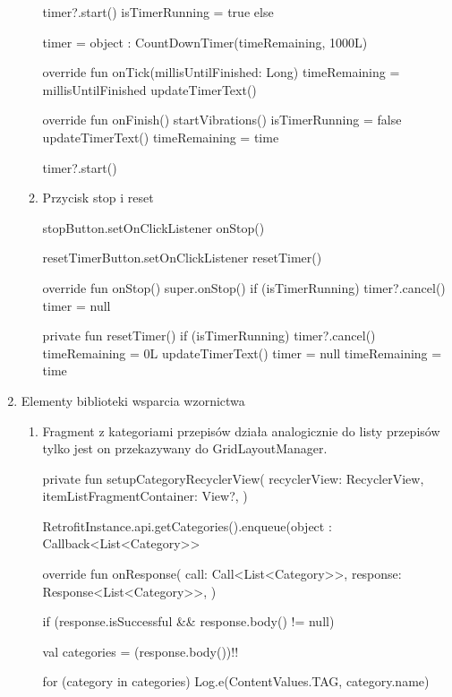 \documentclass{article}
\begin{document}
\begin{enumerate}
\begin{enumerate}
\begin{mylisting}
{{            timer?.start()
            isTimerRunning = true
        } else {
            timer = object : CountDownTimer(timeRemaining, 1000L) {
                override fun onTick(millisUntilFinished: Long) {
                    timeRemaining = millisUntilFinished
                    updateTimerText()
                }

                override fun onFinish() {
                    startVibrations()
                    isTimerRunning = false
                    updateTimerText()
                    timeRemaining = time
                }
            }
            timer?.start()
        }
    }
\end{mylisting}

\newpage
\item Przycisk stop i  reset

\begin{mylisting}
stopButton.setOnClickListener {
    onStop()
}

resetTimerButton.setOnClickListener {
    resetTimer()
}


override fun onStop() {
    super.onStop()
    if (isTimerRunning) {
        timer?.cancel()
        timer = null
    }
}

private fun resetTimer() {
    if (isTimerRunning) {
        timer?.cancel()
        timeRemaining = 0L
        updateTimerText()
        timer = null
        timeRemaining = time
    }
}
\end{mylisting}

\end{enumerate}

\newpage

\item Elementy biblioteki wsparcia wzornictwa
\begin{enumerate}
    \item Fragment z kategoriami przepisów działa analogicznie do listy przepisów
     tylko jest on 
    przekazywany do GridLayoutManager.
\begin{mylisting}
private fun setupCategoryRecyclerView(
    recyclerView: RecyclerView,
    itemListFragmentContainer: View?,
) {
    RetrofitInstance.api.getCategories().enqueue(object : Callback<List<Category>> {
        override fun onResponse(
            call: Call<List<Category>>,
            response: Response<List<Category>>,
        ) {
            if (response.isSuccessful && response.body() != null) {
                val categories = (response.body())!!

                for (category in categories) {
                    Log.e(ContentValues.TAG, category.name)
                }

}}}}
\end{mylisting}
\end{enumerate}
\end{enumerate}
\end{document}
